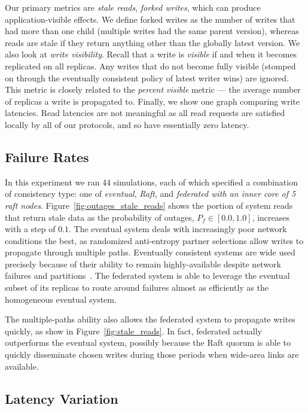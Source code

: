 \documentclass[10pt,conference,letterpaper]{IEEEtran}
\begin{document}
Our primary metrics are \textit{stale reads}, \textit{forked writes}, which can produce
application-visible effects.
We define forked writes as the number of writes that had more than one child (multiple
writes had the same parent version), whereas reads are stale if they return anything other
than the globally latest version.
We also look at \emph{write visibility}.
Recall that a write is \emph{visible} if and when it becomes replicated on all replicas.
Any writes that do not become fully visible (stomped on through the eventually consistent
policy of latest writer wins) are ignored.
This metric is closely related to the \textit{percent visible} metric --- the average
number of replicas a write is propagated to.
Finally, we show one graph comparing write latencies.
Read latencies are not meaningful as all read requests are satisfied locally by all of our
protocols, and so have essentially zero latency.

\subsection{Failure Rates}

In this experiment we ran 44 simulations, each of which specified a combination of
consistency type: one of \textit{eventual}, \textit{Raft}, and
\textit{federated with an inner core of 5 raft nodes}.
Figure~\ref{fig:outages_stale_reads} shows the portion of system reads that return stale
data as the probability of outages, $P_f \in [0.0,1.0]$, increases with a step of $0.1$.
The eventual system deals with increasingly poor network conditions the best,
as randomized anti-entropy partner selections allow writes to propagate through multiple
paths.
Eventually consistent systems are wide used precisely because of their ability to remain
highly-available despite network failures and
partitions~\cite{bailis_bolt-causal_2013,bailis_probabilistically_2012,bailis_quantifying_2014}.
The federated system is able to leverage the eventual subset of its replicas to route
around failures almost as efficiently as the homogeneous eventual system.

The multiple-paths ability also allows the federated system to propagate writes quickly,
as show in Figure~\ref{fig:stale_reads}. In fact, federated actually outperforms the
eventual system, possibly because the Raft quorum is able to quickly disseminate chosen
writes during those periods when wide-area links are available.

\subsection{Latency Variation}
\end{document}
